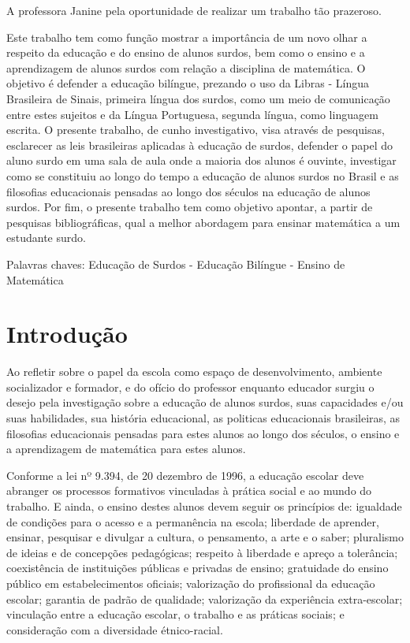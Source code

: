 \documentclass[brasil]{abnt}
\begin{document}
	A professora Janine pela oportunidade de realizar um trabalho tão prazeroso.

\begin{resumo}
	Este trabalho tem como função mostrar a importância de um novo olhar a respeito da educação e do ensino de alunos surdos, bem como o ensino e a aprendizagem de alunos surdos com
	relação a disciplina de matemática. O objetivo é defender a educação bilíngue, prezando o uso da Libras - Língua Brasileira de Sinais, primeira língua dos surdos, como um meio de comunicação entre estes sujeitos 
	e da Língua Portuguesa, segunda língua, como linguagem escrita. O presente trabalho, de cunho investigativo, visa através de pesquisas, esclarecer as leis brasileiras aplicadas à 
	educação  de surdos, defender o papel do aluno surdo em uma sala de aula onde a maioria dos alunos é ouvinte, investigar como se constituiu ao longo do tempo a educação de alunos 
	surdos no Brasil e as filosofias educacionais pensadas ao longo dos séculos na educação de alunos surdos. Por fim, o presente trabalho tem como objetivo apontar, a partir de pesquisas bibliográficas, qual a melhor abordagem para ensinar matemática a um estudante surdo.   
	
	Palavras chaves: Educação de Surdos - Educação Bilíngue - Ensino de Matemática  

\end{resumo}

\tableofcontents

\chapter*{Introdução}
	
	Ao refletir sobre o papel da escola como  espaço de desenvolvimento, ambiente socializador e formador, e do ofício do professor enquanto educador surgiu o desejo pela investigação
	sobre a educação de alunos surdos, suas capacidades e/ou suas habilidades, sua história educacional, as politicas educacionais brasileiras, as filosofias educacionais pensadas para estes alunos
	ao longo dos séculos, o ensino e a aprendizagem de matemática para estes alunos.  
		
	Conforme a lei nº 9.394, de 20 dezembro de 1996, a educação escolar 
	deve abranger os processos formativos vinculadas à prática social e 
	ao mundo do trabalho. E ainda, o ensino destes alunos devem seguir 
	os princípios de: igualdade de condições para o acesso e a 
	permanência na escola; liberdade de aprender, ensinar, pesquisar e 
	divulgar a cultura, o pensamento, a arte e o saber; pluralismo de 
	ideias e de concepções pedagógicas; respeito à liberdade e apreço 
	a tolerância; coexistência de instituições públicas e privadas de 
	ensino; gratuidade do ensino público em estabelecimentos oficiais; 
	valorização do profissional da educação escolar;  
	garantia de padrão de qualidade; valorização da experiência 
	extra-escolar; vinculação entre a educação escolar, o trabalho e 
	as práticas sociais; e consideração com a diversidade étnico-racial.  
	
\end{document}
